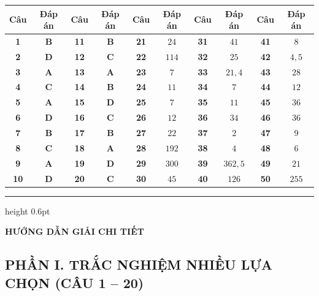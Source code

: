 \documentclass[12pt,a4paper]{article}
\begin{document}
\begin{center}
\renewcommand{\arraystretch}{1.22}
\begin{tabular}{|c|c||c|c||c|c||c|c||c|c|}
\hline
\textbf{Câu} & \textbf{Đáp án} & \textbf{Câu} & \textbf{Đáp án} & \textbf{Câu} & \textbf{Đáp án} & \textbf{Câu} & \textbf{Đáp án} & \textbf{Câu} & \textbf{Đáp án} \\ \hline
\textbf{1} & \textbf{B} & \textbf{11} & \textbf{B} & \textbf{21} & $24$ & \textbf{31} & $41$ & \textbf{41} & $8$ \\ \hline
\textbf{2} & \textbf{D} & \textbf{12} & \textbf{C} & \textbf{22} & $114$ & \textbf{32} & $25$ & \textbf{42} & $4{,}5$ \\ \hline
\textbf{3} & \textbf{A} & \textbf{13} & \textbf{A} & \textbf{23} & $7$ & \textbf{33} & $21{,}4$ & \textbf{43} & $28$ \\ \hline
\textbf{4} & \textbf{C} & \textbf{14} & \textbf{B} & \textbf{24} & $11$ & \textbf{34} & $7$ & \textbf{44} & $12$ \\ \hline
\textbf{5} & \textbf{A} & \textbf{15} & \textbf{D} & \textbf{25} & $7$ & \textbf{35} & $11$ & \textbf{45} & $36$ \\ \hline
\textbf{6} & \textbf{D} & \textbf{16} & \textbf{C} & \textbf{26} & $12$ & \textbf{36} & $34$ & \textbf{46} & $36$ \\ \hline
\textbf{7} & \textbf{B} & \textbf{17} & \textbf{B} & \textbf{27} & $22$ & \textbf{37} & $2$ & \textbf{47} & $9$ \\ \hline
\textbf{8} & \textbf{C} & \textbf{18} & \textbf{A} & \textbf{28} & $192$ & \textbf{38} & $4$ & \textbf{48} & $6$ \\ \hline
\textbf{9} & \textbf{A} & \textbf{19} & \textbf{D} & \textbf{29} & $300$ & \textbf{39} & $362{,}5$ & \textbf{49} & $21$ \\ \hline
\textbf{10} & \textbf{D} & \textbf{20} & \textbf{C} & \textbf{30} & $45$ & \textbf{40} & $126$ & \textbf{50} & $255$ \\ \hline
\end{tabular}
\end{center}

\vspace{8pt}
\hrule height 0.6pt
\vspace{8pt}

\begin{center}
    {\fontsize{13}{15}\selectfont\textbf{HƯỚNG DẪN GIẢI CHI TIẾT}}
\end{center}

\subsection*{PHẦN I. TRẮC NGHIỆM NHIỀU LỰA CHỌN (CÂU 1 -- 20)}
\end{document}
